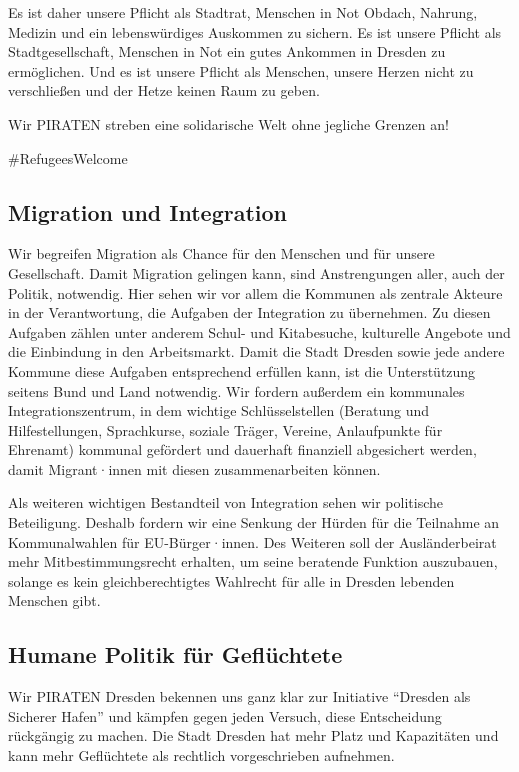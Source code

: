 \documentclass[a4paper, 11pt]{article}
\begin{document}
Es ist daher unsere Pflicht als Stadtrat, Menschen in Not Obdach, Nahrung, Medizin und ein lebenswürdiges Auskommen zu sichern. Es ist unsere Pflicht als Stadtgesellschaft, Menschen in Not ein gutes Ankommen in Dresden zu ermöglichen. Und es ist unsere Pflicht als Menschen, unsere Herzen nicht zu verschließen und der Hetze keinen Raum zu geben.\newline

Wir PIRATEN streben eine solidarische Welt ohne jegliche Grenzen an!\newline

\#RefugeesWelcome


\subsection{Migration und Integration}
Wir begreifen Migration als Chance für den Menschen und für unsere Gesellschaft. Damit Migration gelingen kann, sind Anstrengungen aller, auch der Politik, notwendig. Hier sehen wir vor allem die Kommunen als zentrale Akteure in der Verantwortung, die Aufgaben der Integration zu übernehmen. Zu diesen Aufgaben zählen unter anderem Schul- und Kitabesuche, kulturelle Angebote und die Einbindung in den Arbeitsmarkt. Damit die Stadt Dresden sowie jede andere Kommune diese Aufgaben entsprechend erfüllen kann, ist die Unterstützung seitens Bund und Land notwendig. Wir fordern außerdem ein kommunales Integrationszentrum, in dem wichtige Schlüsselstellen (Beratung und Hilfestellungen, Sprachkurse, soziale Träger, Vereine, Anlaufpunkte für Ehrenamt) kommunal gefördert und dauerhaft finanziell abgesichert werden, damit Migrant·innen mit diesen zusammenarbeiten können.\newline

Als weiteren wichtigen Bestandteil von Integration sehen wir politische Beteiligung. Deshalb fordern wir eine Senkung der Hürden für die Teilnahme an Kommunalwahlen für EU-Bürger·innen. Des Weiteren soll der Ausländerbeirat mehr Mitbestimmungsrecht erhalten, um seine beratende Funktion auszubauen, solange es kein gleichberechtigtes Wahlrecht für alle in Dresden lebenden Menschen gibt.


\subsection{Humane Politik für Geflüchtete}
Wir PIRATEN Dresden bekennen uns ganz klar zur Initiative ``Dresden als Sicherer Hafen'' und kämpfen gegen jeden Versuch, diese Entscheidung rückgängig zu machen. Die Stadt Dresden hat mehr Platz und Kapazitäten und kann mehr Geflüchtete als rechtlich vorgeschrieben aufnehmen.\newline
\end{document}
